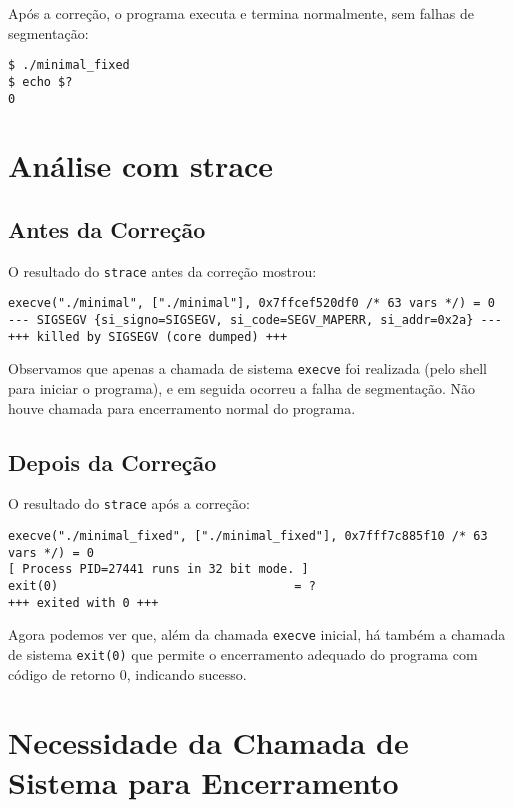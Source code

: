 \documentclass[12pt,a4paper]{article}
\begin{document}
Após a correção, o programa executa e termina normalmente, sem falhas de segmentação:

\begin{verbatim}
$ ./minimal_fixed
$ echo $?
0
\end{verbatim}

\section{Análise com strace}

\subsection{Antes da Correção}

O resultado do \texttt{strace} antes da correção mostrou:

\begin{verbatim}
execve("./minimal", ["./minimal"], 0x7ffcef520df0 /* 63 vars */) = 0
--- SIGSEGV {si_signo=SIGSEGV, si_code=SEGV_MAPERR, si_addr=0x2a} ---
+++ killed by SIGSEGV (core dumped) +++
\end{verbatim}

Observamos que apenas a chamada de sistema \texttt{execve} foi realizada (pelo shell para iniciar o programa), e em seguida ocorreu a falha de segmentação. Não houve chamada para encerramento normal do programa.

\subsection{Depois da Correção}

O resultado do \texttt{strace} após a correção:

\begin{verbatim}
execve("./minimal_fixed", ["./minimal_fixed"], 0x7fff7c885f10 /* 63 vars */) = 0
[ Process PID=27441 runs in 32 bit mode. ]
exit(0)                                 = ?
+++ exited with 0 +++
\end{verbatim}

Agora podemos ver que, além da chamada \texttt{execve} inicial, há também a chamada de sistema \texttt{exit(0)} que permite o encerramento adequado do programa com código de retorno 0, indicando sucesso.

\section{Necessidade da Chamada de Sistema para Encerramento}
\end{document}
